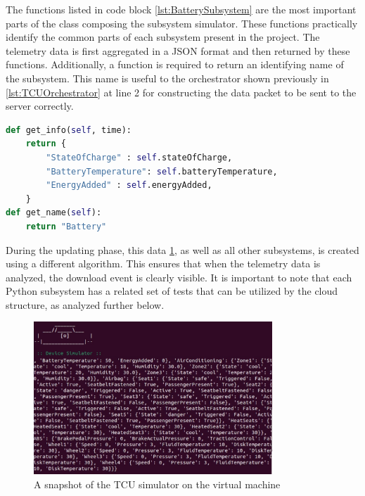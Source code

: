 The functions listed in code block \ref{lst:BatterySubsystem} are the most important parts of the class composing the subsystem simulator. These functions practically identify the common parts of each subsystem present in the project. The telemetry data is first aggregated in a JSON format and then returned by these functions. Additionally, a function is required to return an identifying name of the subsystem. This name is useful to the orchestrator shown previously in \ref{lst:TCUOrchestrator} at line 2 for constructing the data packet to be sent to the server correctly.
\begin{lstlisting}[language=Python, caption={Battery subsystem return code}, label=lst:BatterySubsystem]
def get_info(self, time):
    return {
        "StateOfCharge" : self.stateOfCharge,
        "BatteryTemperature": self.batteryTemperature,
        "EnergyAdded" : self.energyAdded,
    }
def get_name(self):
    return "Battery"  
\end{lstlisting}
During the updating phase, this data \ref{fig:TCUsimulatorP}, as well as all other subsystems, is created using a different algorithm. This ensures that when the telemetry data is analyzed, the download event is clearly visible. It is important to note that each Python subsystem has a related set of tests that can be utilized by the cloud structure, as analyzed further below.
\begin{figure}[h]  %
    \centering
    \includegraphics[width=0.8\textwidth]{images/TCUsimulatorP.png}  %
    \caption{A snapshot of the TCU simulator on the virtual machine}
    \label{fig:TCUsimulatorP}
\end{figure}

